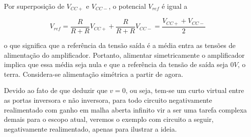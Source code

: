 \documentclass{article}
\numberwithin{equation}{section}
\let\dfr\dfrac
\begin{document}
\begin{center}
\end{center}

\noindent Por superposição de $V_{CC+}$ e $V_{CC-}$, o potencial $V_{ref}$ é igual a

\begin{equation*}
    V_{ref} = \dfr{R}{R+R}V_{CC+} + \dfr{R}{R+R}V_{CC-} = \dfr{V_{CC+}+V_{CC-}}{2}
\end{equation*}

\noindent o que significa que a referência da tensão saída é a média entra as tensões de alimentação do amplificador. Portanto, alimentar simetricamente o amplificador implica que essa média seja nula e que a referência da tensão de saída seja $0V$, o terra. Considera-se alimentação simétrica a partir de agora.

\begin{center}
\end{center}

Devido ao fato de que deduzir que $v=0$, ou seja, tem-se um curto virtual entre as portas inversora e não inversora, para todo circuito negativamente realimentado com ganho em malha aberta infinito vir a ser uma tarefa complexa demais para o escopo atual, veremos o exemplo com circuito a seguir, negativamente realimentado, apenas para ilustrar a ideia.


\begin{center}
\end{center}
\end{document}

